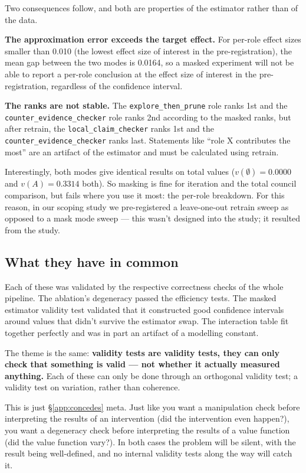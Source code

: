Two consequences follow, and both are properties of the estimator rather than of the data.

\textbf{The approximation error exceeds the target effect.} For per-role effect sizes smaller than
0.010 (the lowest effect size of interest in the pre-registration), the mean gap between the two
modes is 0.0164, so a masked experiment will not be able to report a per-role conclusion at the
effect size of interest in the pre-registration, regardless of the confidence interval.

\textbf{The ranks are not stable.} The \texttt{explore\_then\_prune} role ranks 1st and the
\texttt{counter\_evidence\_checker} role ranks 2nd according to the masked ranks, but after retrain,
the \texttt{local\_claim\_checker} ranks 1st and the \texttt{counter\_evidence\_checker} ranks last.
Statements like ``role X contributes the most'' are an artifact of the estimator and must be
calculated using retrain.

Interestingly, both modes give identical results on total values ($v(\emptyset) = 0.0000$ and
$v(A) = 0.3314$ both). So masking is fine for iteration and the total council comparison, but fails
where you use it most: the per-role breakdown. For this reason, in our scoping study we
pre-registered a leave-one-out retrain sweep as opposed to a mask mode sweep --- this wasn't designed
into the study; it resulted from the study.

\subsection{What they have in common}

Each of these was validated by the respective correctness checks of the whole pipeline. The
ablation's degeneracy passed the efficiency tests. The masked estimator validity test validated that
it constructed good confidence intervals around values that didn't survive the estimator swap. The
interaction table fit together perfectly and was in part an artifact of a modelling constant.

The theme is the same: \textbf{validity tests are validity tests, they can only check that something
is valid --- not whether it actually measured anything.} Each of these can only be done through an
orthogonal validity test; a validity test on variation, rather than coherence.

This is just \S\ref{app:concedes} meta. Just like you want a manipulation check before interpreting
the results of an intervention (did the intervention even happen?), you want a degeneracy check
before interpreting the results of a value function (did the value function vary?). In both cases the
problem will be silent, with the result being well-defined, and no internal validity tests along the
way will catch it.

